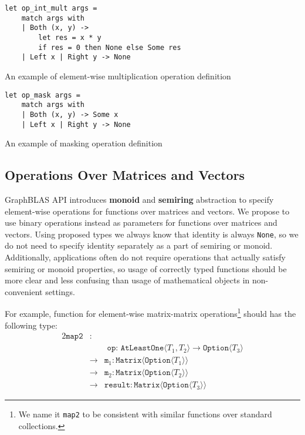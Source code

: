 \begin{listing}[h]
    \begin{verbatim}
let op_int_mult args =
    match args with
    | Both (x, y) -> 
        let res = x * y 
        if res = 0 then None else Some res 
    | Left x | Right y -> None
    \end{verbatim}
    \caption{An example of element-wise multiplication operation definition}
    \label{lst:opIntMult}
\end{listing}

\begin{listing}[h]
    \begin{verbatim}
let op_mask args =
    match args with
    | Both (x, y) -> Some x
    | Left x | Right y -> None
    \end{verbatim}
    \caption{An example of masking operation definition}
    \label{lst:opMask}
\end{listing}

\subsection{Operations Over Matrices and Vectors}

GraphBLAS API introduces \textbf{monoid} and \textbf{semiring} abstraction to specify element-wise operations for functions over matrices and vectors.
We propose to use binary operations instead as parameters for functions over matrices and vectors.
Using proposed types we always know that identity is always \texttt{None}, so we do not need to specify identity separately as a part of semiring or monoid.
Additionally, applications often do not require operations that actually satisfy semiring or monoid properties, so usage of correctly typed functions should be more clear and less confusing than usage of mathematical objects in non-convenient settings.

For example, function for element-wise matrix-matrix operations\footnote{We name it \texttt{map2} to be consistent with similar functions over standard collections.} should has the following type:
\begin{alignat*}{2}
    \texttt{map2} & : & \\ 
        &   & \texttt{ op: AtLeastOne} \langle T_1, T_2 \rangle \to \texttt{Option} \langle T_3 \rangle \\
        & \to & \texttt{m}_1: \texttt{Matrix} \langle \texttt{Option} \langle T_1\rangle \rangle \\
        & \to & \texttt{m}_2: \texttt{Matrix} \langle \texttt{Option} \langle T_2 \rangle \rangle \\
        & \to & \texttt{result}: \texttt{Matrix} \langle \texttt{Option} \langle T_3\rangle \rangle
\end{alignat*}

